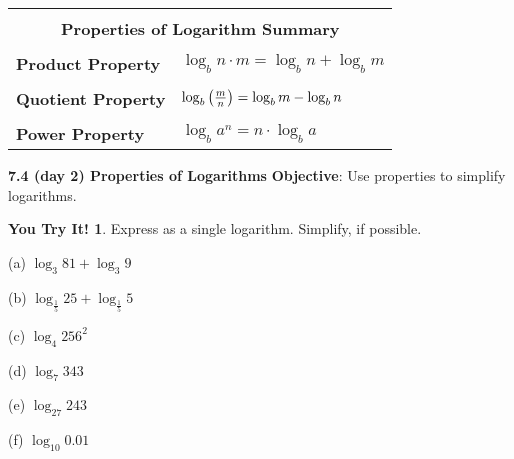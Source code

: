 \documentclass{report}
\theoremstyle{definition}
\newtheorem{youtry}{\bf You Try It!}
\begin{document}
\begin{center}
	\large
	\begin{tabular}[t]{|l|l|}
		\hline
		\multicolumn{2}{|c|}{}\\
		\multicolumn{2}{|c|}{\textbf{ Properties of Logarithm  Summary}}\\
		\hline
		&\\
		\textbf{Product Property} & $\log_b n\cdot m = \log_b n + \log_b m$ \\
		\hline
		&\\
		\textbf{Quotient Property} & $\log_b \big{(}\frac{m}{n}\big{)} = \log_b m - \log_b n$\\
		\hline 
		&\\
		\textbf{Power Property} & $\log_b a^n = n\cdot \log_b a$\\
		\hline
	\end{tabular}
	\normalsize
\end{center}

\vfill

 \noindent{}
 \newpage

\noindent\Large{\textbf{7.4 (day 2) Properties of Logarithms}} 
\indent\hfill\small\noindent \textbf{Objective}: Use properties to simplify logarithms.  \normalsize\\

\begin{youtry}
Express as a single logarithm. Simplify, if possible.
\end{youtry}

\begin{minipage}[t]{0.3\linewidth}
 (a) $\log_3 81 + \log_3 9$
\end{minipage}
\hfill
\begin{minipage}[t]{0.3\linewidth}
 (b) $ \log_\frac{1}{5} 25 + \log_\frac{1}{5} 5$
\end{minipage}
\hfill
\begin{minipage}[t]{0.3\linewidth}
 (c) $\log_4 256^2$
\end{minipage}
\vfill

\begin{minipage}[t]{0.3\linewidth}
 (d) $\log_7 343$
\end{minipage}
\hfill
\begin{minipage}[t]{0.3\linewidth}
 (e) $\log_{27} 243$
\end{minipage}
\hfill
\begin{minipage}[t]{0.3\linewidth}
 (f) $\log_{10} 0.01$
\end{minipage}
\vfill
\end{document}
